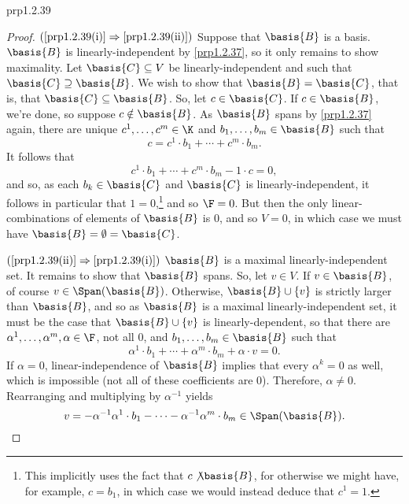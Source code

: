 \begin{prp}{}{prp1.2.39}
\begin{proof}
		\blni
		$(\cref{prp1.2.39(i)}\Rightarrow \cref{prp1.2.39(ii)})$ Suppose that $\basis{B}$ is a basis.  $\basis{B}$ is linearly-independent by \cref{prp1.2.37}, so it only remains to show maximality.  Let $\basis{C}\subseteq V$ be linearly-independent and such that $\basis{C}\supseteq \basis{B}$.  We wish to show that $\basis{B}=\basis{C}$, that is, that $\basis{C}\subseteq \basis{B}$.  So, let $c\in \basis{C}$.  If $c\in \basis{B}$, we're done, so suppose $c\notin \basis{B}$.  As $\basis{B}$ spans by \cref{prp1.2.37} again, there are unique $c^1,\ldots ,c^m\in \K$ and $b_1,\ldots ,b_m\in \basis{B}$ such that
		\begin{equation}
			c=c^1\cdot b_1+\cdots +c^m\cdot b_m.
		\end{equation}
		It follows that
		\begin{equation}
			c^1\cdot b_1+\cdots +c^m\cdot b_m-1\cdot c=0,
		\end{equation}
		and so, as each $b_k\in \basis{C}$ and $\basis{C}$ is linearly-independent, it follows in particular that $1=0$,\footnote{This implicitly uses the fact that $c\not \basis{B}$, for otherwise we might have, for example, $c=b_1$, in which case we would instead deduce that $c^1=1$.} and so $\F =0$.  But then the only linear-combinations of elements of $\basis{B}$ is $0$, and so $V=0$, in which case we must have $\basis{B}=\emptyset =\basis{C}$.
		
		\blni
		$(\cref{prp1.2.39(ii)}\Rightarrow \cref{prp1.2.39(i)})$ $\basis{B}$ is a maximal linearly-independent set.  It remains to show that $\basis{B}$ spans.  So, let $v\in V$.  If $v\in \basis{B}$, of course $v\in \Span (\basis{B})$.  Otherwise, $\basis{B}\cup \{ v\}$ is strictly larger than $\basis{B}$, and so as $\basis{B}$ is a maximal linearly-independent set, it must be the case that $\basis{B}\cup \{ v\}$ is linearly-dependent, so that there are $\alpha ^1,\ldots ,\alpha ^m,\alpha \in \F$, not all $0$, and $b_1,\ldots ,b_m\in \basis{B}$ such that
		\begin{equation}
			\alpha ^1\cdot b_1+\cdots +\alpha ^m\cdot b_m+\alpha \cdot v=0.
		\end{equation}
		If $\alpha =0$, linear-independence of $\basis{B}$ implies that every $\alpha ^k=0$ as well, which is impossible (not all of these coefficients are $0$).  Therefore, $\alpha \neq 0$.  Rearranging and multiplying by $\alpha ^{-1}$ yields
		\begin{equation}
			v=-\alpha ^{-1}\alpha ^1\cdot b_1-\cdots -\alpha ^{-1}\alpha ^m\cdot b_m\in \Span (\basis{B}).
		\end{equation}
		

\end{proof}
\end{prp}
